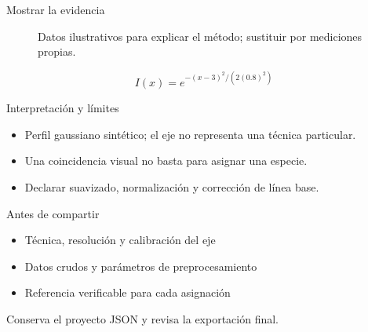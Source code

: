 \documentclass[aspectratio=169,11pt]{beamer}
\begin{document}
\begin{frame}{Mostrar la evidencia}
  \transdissolve[duration=0.25]
  \begin{figure}
    \centering
    \caption{Datos ilustrativos para explicar el método; sustituir por mediciones propias.}
  \end{figure}
  \medskip

  \begin{equation*}
    I(x)=e^{-(x-3)^2/(2(0.8)^2)}
  \end{equation*}
\end{frame}

\begin{frame}{Interpretación y límites}
  \transdissolve[duration=0.25]
  \begin{itemize}
    \item Perfil gaussiano sintético; el eje no representa una técnica particular.
    \item Una coincidencia visual no basta para asignar una especie.
    \item Declarar suavizado, normalización y corrección de línea base.
  \end{itemize}
\end{frame}

\begin{frame}{Antes de compartir}
  \transdissolve[duration=0.25]
  \begin{itemize}
    \item Técnica, resolución y calibración del eje
    \item Datos crudos y parámetros de preprocesamiento
    \item Referencia verificable para cada asignación
  \end{itemize}
  \medskip

  {\small Conserva el proyecto JSON y revisa la exportación final.}
\end{frame}
\end{document}
